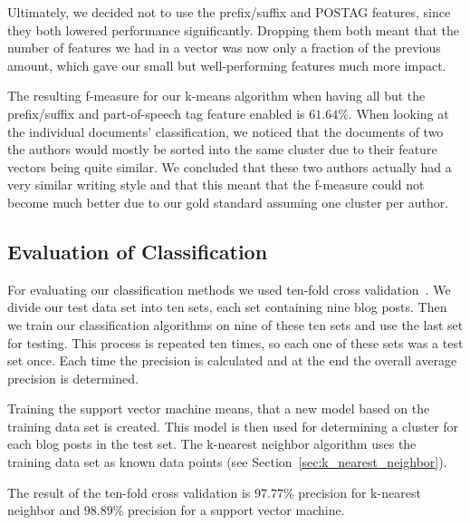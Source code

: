Ultimately, we decided not to use the prefix/suffix and POSTAG features, since they both lowered performance significantly.
Dropping them both meant that the number of features we had in a vector was now only a fraction of the previous amount, which gave our small but well-performing features much more impact.


The resulting f-measure for our k-means algorithm when having all but the prefix/suffix and part-of-speech tag feature enabled is $61.64\%$.
When looking at the individual documents' classification, we noticed that the documents of two the authors would mostly be sorted into the same cluster due to their feature vectors being quite similar.
We concluded that these two authors actually had a very similar writing style and that this meant that the f-measure could not become much better due to our gold standard assuming one cluster per author.


\subsection{Evaluation of Classification}


For evaluating our classification methods we used ten-fold cross validation~\cite{kohavi1995study}.
We divide our test data set into ten sets, each set containing nine blog posts.
Then we train our classification algorithms on nine of these ten sets and use the last set for testing.
This process is repeated ten times, so each one of these sets was a test set once.
Each time the precision is calculated and at the end the overall average precision is determined.


Training the support vector machine means, that a new model based on the training data set is created.
This model is then used for determining a cluster for each blog posts in the test set.
The k-nearest neighbor algorithm uses the training data set as known data points (see Section~\ref{sec:k_nearest_neighbor}).


The result of the ten-fold cross validation is $97.77\%$ precision for k-nearest neighbor and $98.89\%$ precision for a support vector machine.
